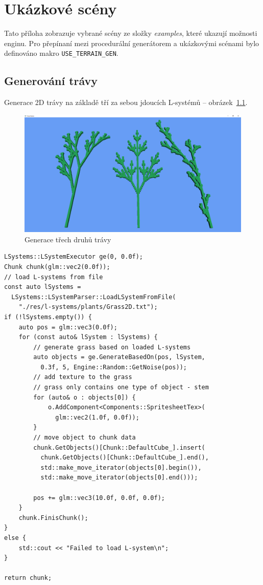 \documentclass[thesis=M,czech]{FITthesis}[2019/12/23]
\begin{document}
\chapter{Ukázkové scény} \label{sec:examples}

Tato příloha zobrazuje vybrané scény ze složky \textit{examples}, které ukazují mož\-nosti enginu. Pro přepínaní mezi procedurální generátorem a ukázkovými scénami bylo definováno makro \texttt{USE\_TERRAIN\_GEN}.

\section{Generování trávy}

Generace 2D trávy na základě tří za sebou jdoucích L-systémů -- obrázek~\ref{fig:ex_grass}.

\begin{figure}\centering
	\includegraphics[width=\textwidth]{images/examples/grass}
	\caption[Generace třech druhů trávy]{Generace třech druhů trávy}\label{fig:ex_grass}
\end{figure}

\begin{verbatim}
LSystems::LSystemExecutor ge(0, 0.0f);
Chunk chunk(glm::vec2(0.0f));
// load L-systems from file
const auto lSystems = 
  LSystems::LSystemParser::LoadLSystemFromFile(
    "./res/l-systems/plants/Grass2D.txt");
if (!lSystems.empty()) {
    auto pos = glm::vec3(0.0f);
    for (const auto& lSystem : lSystems) {
        // generate grass based on loaded L-systems
        auto objects = ge.GenerateBasedOn(pos, lSystem,
          0.3f, 5, Engine::Random::GetNoise(pos));
        // add texture to the grass
        // grass only contains one type of object - stem
        for (auto& o : objects[0]) {
            o.AddComponent<Components::SpritesheetTex>(
              glm::vec2(1.0f, 0.0f));
        }
        // move object to chunk data
        chunk.GetObjects()[Chunk::DefaultCube_].insert(
          chunk.GetObjects()[Chunk::DefaultCube_].end(),
          std::make_move_iterator(objects[0].begin()),
          std::make_move_iterator(objects[0].end()));

        pos += glm::vec3(10.0f, 0.0f, 0.0f);
    }
    chunk.FinisChunk();
}
else {
    std::cout << "Failed to load L-system\n";
}

return chunk;
\end{verbatim}
\end{document}
